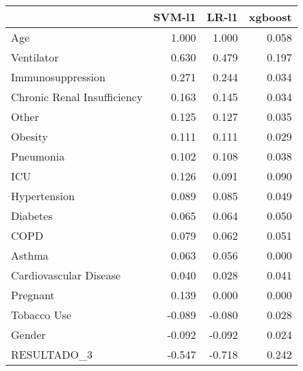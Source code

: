 \begin{tabular}{lrrr}
\toprule
{} &  SVM-l1 &  LR-l1 &  xgboost \\
\midrule
Age                         &   1.000 &  1.000 &    0.058 \\
Ventilator                  &   0.630 &  0.479 &    0.197 \\
Immunosuppression           &   0.271 &  0.244 &    0.034 \\
Chronic Renal Insufficiency &   0.163 &  0.145 &    0.034 \\
Other                       &   0.125 &  0.127 &    0.035 \\
Obesity                     &   0.111 &  0.111 &    0.029 \\
Pneumonia                   &   0.102 &  0.108 &    0.038 \\
ICU                         &   0.126 &  0.091 &    0.090 \\
Hypertension                &   0.089 &  0.085 &    0.049 \\
Diabetes                    &   0.065 &  0.064 &    0.050 \\
COPD                        &   0.079 &  0.062 &    0.051 \\
Asthma                      &   0.063 &  0.056 &    0.000 \\
Cardiovascular Disease      &   0.040 &  0.028 &    0.041 \\
Pregnant                    &   0.139 &  0.000 &    0.000 \\
Tobacco Use                 &  -0.089 & -0.080 &    0.028 \\
Gender                      &  -0.092 & -0.092 &    0.024 \\
RESULTADO\_3                 &  -0.547 & -0.718 &    0.242 \\
\bottomrule
\end{tabular}
